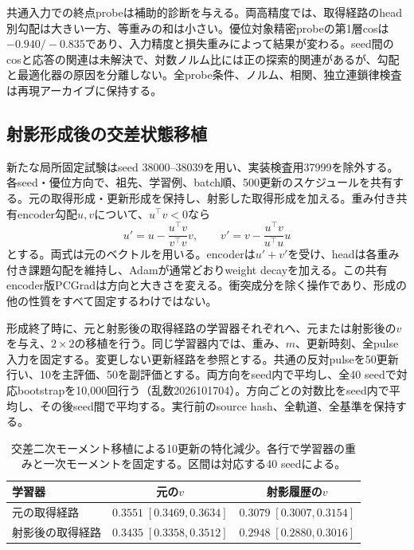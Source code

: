 共通入力での終点probeは補助的診断を与える。両高精度では、取得経路のhead別勾配は大きい一方、等重みの和は小さい。優位対象精密probeの第1層cosは$-0.940/-0.835$であり、入力精度と損失重みによって結果が変わる。seed間のcosと応答の関連は未解決で、対数ノルム比には正の探索的関連があるが、勾配と最適化器の原因を分離しない。全probe条件、ノルム、相関、独立連鎖律検査は再現アーカイブに保持する。

\subsection{射影形成後の交差状態移植}
\label{app:projection}
新たな局所固定試験はseed 38000--38039を用い、実装検査用37999を除外する。各seed・優位方向で、祖先、学習例、batch順、500更新のスケジュールを共有する。元の取得形成・更新形成を保持し、射影した取得形成を加える。重み付き共有encoder勾配$u,v$について、$u^\top v<0$なら
\begin{equation}u'=u-\frac{u^\top v}{v^\top v}v,\qquad v'=v-\frac{u^\top v}{u^\top u}u\end{equation}
とする。両式は元のベクトルを用いる。encoderは$u'+v'$を受け、headは各重み付き課題勾配を維持し、Adamが通常どおりweight decayを加える。この共有encoder版PCGradは方向と大きさを変える。衝突成分を除く操作であり、形成の他の性質をすべて固定するわけではない。

形成終了時に、元と射影後の取得経路の学習器それぞれへ、元または射影後の$v$を与え、$2\times2$の移植を行う。同じ学習器内では、重み、$m$、更新時刻、全pulse入力を固定する。変更しない更新経路を参照とする。共通の反対pulseを50更新行い、10を主評価、50を副評価とする。両方向をseed内で平均し、全40 seedで対応bootstrapを10,000回行う（乱数2026101704）。方向ごとの対数比をseed内で平均し、その後seed間で平均する。実行前のsource hash、全軌道、全基準を保持する。

\begin{table}[ht]\centering\small
\caption{交差二次モーメント移植による10更新の特化減少。各行で学習器の重みと一次モーメントを固定する。区間は対応する40 seedによる。}
\label{tab:projection}
\begin{tabular}{lcc}\toprule
学習器 & 元の$v$ & 射影履歴の$v$\\
\midrule
元の取得経路 & $0.3551\;[0.3469,0.3634]$ & $0.3079\;[0.3007,0.3154]$\\
射影後の取得経路 & $0.3435\;[0.3358,0.3512]$ & $0.2948\;[0.2880,0.3016]$\\
\bottomrule\end{tabular}\end{table}

